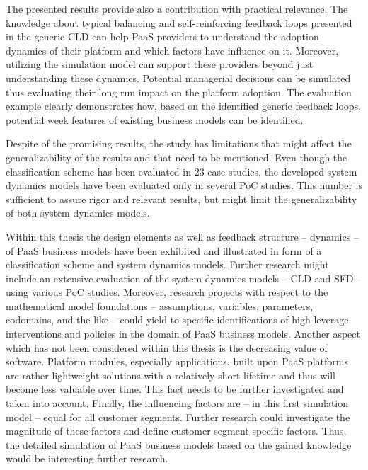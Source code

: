 The presented results provide also a contribution with practical relevance. The knowledge about typical balancing and self-reinforcing feedback loops presented in the generic \ac{CLD} can help \ac{PaaS} providers to understand the adoption dynamics of their platform and which factors have influence on it. Moreover, utilizing the simulation model can support these providers beyond just understanding these dynamics. Potential managerial decisions can be simulated thus evaluating their long run impact on the platform adoption. The evaluation example clearly demonstrates how, based on the identified generic feedback loops, potential week features of existing business models can be identified.

Despite of the promising results, the study has limitations that might affect the generalizability of the results and that need to be mentioned. Even though the classification scheme has been evaluated in 23 case studies, the developed system dynamics models have been evaluated only in several \acf{PoC} studies. This number is sufficient to assure rigor and relevant results, but might limit the generalizability of both system dynamics models.

Within this thesis the design elements as well as feedback structure -- dynamics -- of \ac{PaaS} business models have been exhibited and illustrated in form of a classification scheme and system dynamics models. Further research might include an extensive evaluation of the system dynamics models -- \ac{CLD} and \ac{SFD} -- using various \ac{PoC} studies. Moreover, research projects with respect to the mathematical model foundations -- assumptions, variables, parameters, codomains, and the like -- could yield to specific identifications of high-leverage interventions and policies in the domain of \ac{PaaS} business models. Another aspect which has not been considered within this thesis is the decreasing value of software. Platform modules, especially applications, built upon \ac{PaaS} platforms are rather lightweight solutions with a relatively short lifetime and thus will become less valuable over time. This fact needs to be further investigated and taken into account. Finally, the influencing factors are -- in this first simulation model -- equal for all customer segments. Further research could investigate the magnitude of these factors and define customer segment specific factors. Thus, the detailed simulation of \ac{PaaS} business models based on the gained knowledge would be interesting further research.
